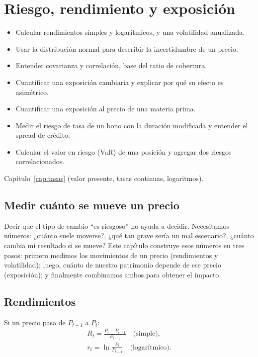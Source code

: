 \chapter{Riesgo, rendimiento y exposición}\label{cap:riesgo}

\begin{objetivos}
\begin{itemize}
\item Calcular rendimientos simples y logarítmicos, y una volatilidad anualizada.
\item Usar la distribución normal para describir la incertidumbre de un precio.
\item Entender covarianza y correlación, base del ratio de cobertura.
\item Cuantificar una exposición cambiaria y explicar por qué su efecto es asimétrico.
\item Cuantificar una exposición al precio de una materia prima.
\item Medir el riesgo de tasa de un bono con la duración modificada y entender el spread de crédito.
\item Calcular el valor en riesgo (VaR) de una posición y agregar dos riesgos correlacionados.
\end{itemize}
\end{objetivos}

\begin{prerreq}Capítulo~\ref{cap:tasas} (valor presente, tasas continuas, logaritmos).\end{prerreq}

\section{Medir cuánto se mueve un precio}

Decir que el tipo de cambio \enquote{es riesgoso} no ayuda a decidir. Necesitamos números: ¿cuánto suele moverse?, ¿qué tan grave sería un mal escenario?, ¿cuánto cambia mi resultado si se mueve? Este capítulo construye esos números en tres pasos: primero medimos los movimientos de un precio (rendimientos y volatilidad); luego, cuánto de nuestro patrimonio depende de ese precio (exposición); y finalmente combinamos ambos para obtener el impacto.

\section{Rendimientos}

\begin{definicion}
Si un precio pasa de $P_{t-1}$ a $P_t$:
\begin{gather*} R_t=\frac{P_t-P_{t-1}}{P_{t-1}}\quad\text{(simple)},\\ r_t=\ln\frac{P_t}{P_{t-1}}\quad\text{(logarítmico)}. \end{gather*}
\end{definicion}

